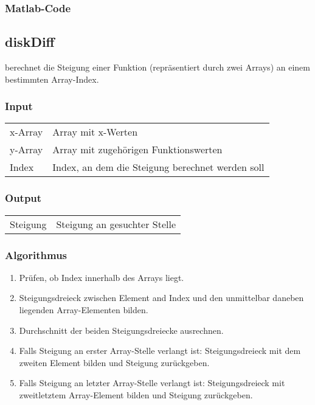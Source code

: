 \subsubsection*{Matlab-Code}



\subsection{diskDiff}

 berechnet  die Steigung einer Funktion  (repr\"asentiert durch
zwei Arrays) an einem bestimmten Array-Index.

\subsubsection*{Input}

\begin{tabular}{p{40mm}l}
    x-Array        & Array mit x-Werten \\
    y-Array        & Array mit zugeh\"origen Funktionswerten \\
    Index          & Index, an dem die Steigung berechnet werden soll
\end{tabular}

\subsubsection*{Output}
\begin{tabular}{p{40mm}l}
    Steigung   & Steigung an gesuchter Stelle
\end{tabular}

\subsubsection*{Algorithmus}
\begin{enumerate}
    \item
        Pr\"ufen, ob Index innerhalb des Arrays liegt.
    \item
        Steigungsdreieck  zwischen  Element  and  Index  und  den  unmittelbar
        daneben liegenden Array-Elementen bilden.
    \item
        Durchschnitt der beiden Steigungsdreiecke ausrechnen.
    \item
        Falls Steigung an erster Array-Stelle verlangt ist: Steigungsdreieck
        mit dem zweiten Element bilden und Steigung zur\"uckgeben.
    \item
        Falls Steigung an letzter Array-Stelle verlangt ist: Steigungsdreieck
        mit zweitletztem Array-Element bilden und Steigung zur\"uckgeben.
\end{enumerate}

